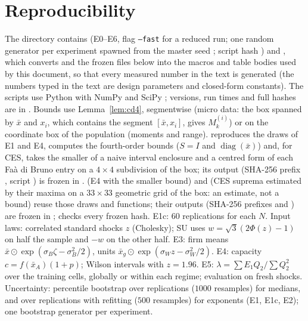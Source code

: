 \documentclass[10pt,a4paper]{article}
\theoremstyle{plain}
\theoremstyle{definition}
\theoremstyle{remark}
\begin{document}
\section{Reproducibility}\label{app:repro}
{\sloppy The directory contains  (E0--E6, flag \texttt{--fast} for a reduced run; one random generator per experiment spawned from the master seed \MetaSeed; script hash \MetaScriptSha) and , which converts  and the frozen files below into the macros and table bodies used by this document, so that every measured number in the text is generated (the numbers typed in the text are design parameters and closed-form constants). The scripts use Python with NumPy \citep{harris2020} and SciPy \citep{virtanen2020}; versions, run times and full hashes are in . Bounds use Lemma~\ref{lem:cd4}, segmentwise (micro data: the box spanned by $\bar x$ and $x_i$, which contains the segment $[\bar x,x_i]$, gives $M_k^{(i)}$) or on the coordinate box of the population (moments and range).  reproduces the draws of E1 and E4, computes the fourth-order bounds ($S=I$ and $\operatorname{diag}(\bar x)$) and, for CES, takes the smaller of a naive interval enclosure and a centred form of each Fa\`a di Bruno entry on a $4\times4$ subdivision of the box; its output  (SHA-256 prefix \SharpJsonSha, script \SharpScriptSha) is frozen in .  (E4 with the smaller bound) and  (CES suprema estimated by their maxima on a $33\times33$ geometric grid of the box: an estimate, not a bound) reuse those draws and functions; their outputs (SHA-256 prefixes \MinEfourJsonSha{} and \CesGridJsonSha) are frozen in ;  checks every frozen hash. E1c: $60$ replications for each $N$. Input laws: correlated standard shocks $z$ (Cholesky); SU uses $w=\sqrt3(2\Phi(z)-1)$ on half the sample and $-w$ on the other half. E3: firm means $\bar x\odot\exp(\sigma_B\zeta-\sigma_B^2/2)$, units $\bar x_g\odot\exp(\sigma_Wz-\sigma_W^2/2)$. E4: capacity $c=f(\bar x_A)(1+p)$; Wilson intervals with $z=1.96$. E5: $\lambda=\sum E_1Q_2/\sum Q_2^2$ over the training cells, globally or within each regime; evaluation on fresh shocks. Uncertainty: percentile bootstrap over replications ($1000$ resamples) for medians, and over replications with refitting ($500$ resamples) for exponents (E1, E1c, E2); one bootstrap generator per experiment.\par}

\providecommand{\bibfont}{}\renewcommand{\bibfont}{\footnotesize}\setlength{\bibsep}{0pt plus 0.5pt}


\end{document}
